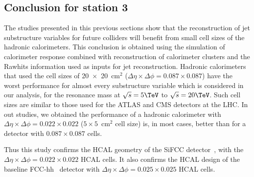 \documentclass[12pt,twoside,a4paper,an,final]{cms-tdr}
\begin{document}
\subsection{Conclusion for station 3}
The studies presented in this previous sections show that the reconstruction of jet substructure 
variables for future colliders will benefit from small cell sizes of the hadronic calorimeters. 
This conclusion is obtained using the simulation of calorimeter response combined with reconstruction of 
calorimeter clusters and the Rawhits information used as inputs for jet reconstruction. 
Hadronic calorimeters that used the cell sizes of 20~$\times $~20~cm$^2$ ($\Delta \eta \times \Delta \phi = 0.087\times 0.087$) 
have the worst performance for almost every 
substructure variable which is considered in our analysis, for the resonance mass at $\sqrt{s} = 5\TeV$ to $\sqrt{s} = 20\TeV$. 
Such cell sizes are similar to those used for the ATLAS and CMS detectors at the LHC. 
In out studies, we obtained the performance of a hadronic calorimeter with 
$\Delta \eta \times \Delta \phi = 0.022\times0.022$ ($5 \times 5$~$\mathrm{cm}^2$ cell size) is, in most cases,
better than for a detector with $0.087\times 0.087$ cells.

Thus this study confirms the HCAL geometry of the SiFCC detector~\cite{Chekanov:2016ppq},
with the $\Delta \eta \times \Delta \phi = 0.022\times0.022$ HCAL cells.
It also confirms the HCAL design of the baseline FCC-hh~\cite{fcc1,fcc2} detector with
$\Delta \eta \times \Delta \phi = 0.025\times0.025$ HCAL cells.
\end{document}
